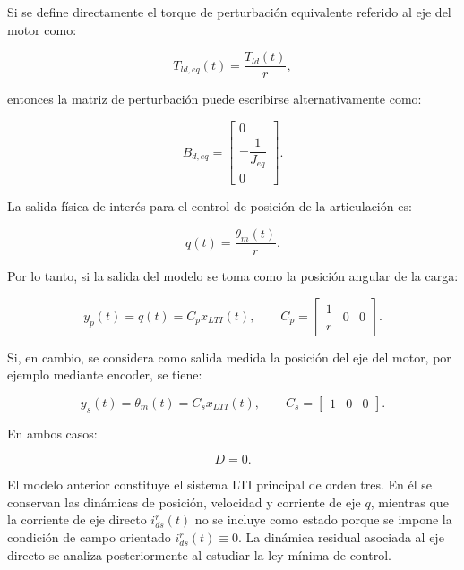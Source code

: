 \documentclass[10pt,a4paper]{article}
\begin{document}
Si se define directamente el torque de perturbación equivalente referido al eje del motor como:

\begin{equation*}
	T_{ld,eq}(t)=\frac{T_{ld}(t)}{r},
\end{equation*}

entonces la matriz de perturbación puede escribirse alternativamente como:

\begin{equation*}
	B_{d,eq}
	=
	\begin{bmatrix}
		0\\[2mm]
		-\dfrac{1}{J_{eq}}\\[2mm]
		0
	\end{bmatrix}.
\end{equation*}

La salida física de interés para el control de posición de la articulación es:

\begin{equation*}
	q(t)=\frac{\theta_m(t)}{r}.
\end{equation*}

Por lo tanto, si la salida del modelo se toma como la posición angular de la carga:

\begin{equation*}
	y_p(t)=q(t)=C_p x_{LTI}(t),
	\qquad
	C_p=
	\begin{bmatrix}
		\dfrac{1}{r} & 0 & 0
	\end{bmatrix}.
\end{equation*}

Si, en cambio, se considera como salida medida la posición del eje del motor, por ejemplo mediante encoder, se tiene:

\begin{equation*}
	y_s(t)=\theta_m(t)=C_s x_{LTI}(t),
	\qquad
	C_s=
	\begin{bmatrix}
		1 & 0 & 0
	\end{bmatrix}.
\end{equation*}

En ambos casos:

\begin{equation*}
	D=0.
\end{equation*}

El modelo anterior constituye el sistema LTI principal de orden tres. En él se conservan las dinámicas de posición, velocidad y corriente de eje $q$, mientras que la corriente de eje directo $i_{ds}^r(t)$ no se incluye como estado porque se impone la condición de campo orientado $i_{ds}^r(t)\equiv 0$. La dinámica residual asociada al eje directo se analiza posteriormente al estudiar la ley mínima de control.
\end{document}
